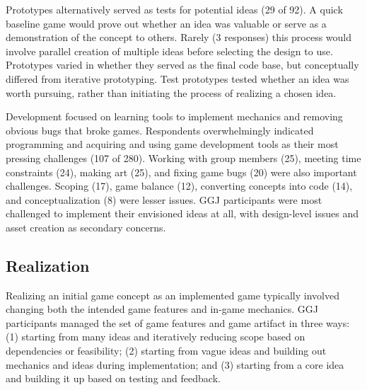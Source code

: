 \documentclass{sig-alternate}
\begin{document}
Prototypes alternatively served as tests for potential ideas (29 of 92).
A quick baseline game would prove out whether an idea was valuable or serve as a demonstration of the concept to others. Rarely (3 responses) this process would involve parallel creation of multiple ideas before selecting the design to use. Prototypes varied in whether they served as the final code base, but conceptually differed from iterative prototyping. Test prototypes tested whether an idea was worth pursuing, rather than initiating the process of realizing a chosen idea.


Development focused on learning tools to implement mechanics and removing obvious bugs that broke games. Respondents overwhelmingly indicated programming and acquiring and using game development tools as their most pressing challenges (107 of 280). Working with group members (25), meeting time constraints (24), making art (25), and fixing game bugs (20) were also important challenges. Scoping (17), game balance (12), converting concepts into code (14), and conceptualization (8) were lesser issues.
GGJ participants were most challenged to implement their envisioned ideas at all, with design-level issues and asset creation as secondary concerns.

\subsection{Realization}
Realizing an initial game concept as an implemented game typically involved changing both the intended game features and in-game mechanics. 
GGJ participants managed the set of game features and game artifact in three ways:
(1) starting from many ideas and iteratively reducing scope based on dependencies or feasibility;
(2) starting from vague ideas and building out mechanics and ideas during implementation;
and
(3) starting from a core idea and building it up based on testing and feedback.
\end{document}
